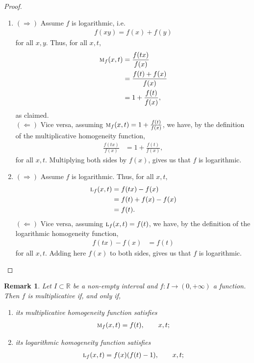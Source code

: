 \documentclass{amsart}
\theoremstyle{plain}
\newtheorem{remark}{Remark}
\numberwithin{equation}{section}
\newcommand{\R}{{\mathbb{R}}}
\begin{document}
\begin{proof}
    \begin{enumerate}
    \item
  \textbf{$(\Rightarrow)$} 
    Assume $f$ is logarithmic, i.e.
\begin{align*}
f(x y)= f(x) + f(y)  
\end{align*}
for all $x,y$.
 Thus, for all $x,t$,
\begin{align*}
\textsc{m}_f (x,t) &= \frac{f(tx)}{f(x)}\\
&=
\frac{f(t) + f(x)}{f(x)}\\
&=
1 + \frac{f(t)}{f(x)},
\end{align*}
as claimed. \\
\textbf{$(\Leftarrow)$} Vice versa, assuming $\textsc{m}_f (x,t)= 1 + \frac{f(t)}{f(x)}$,
we have, by the definition of the multiplicative homogeneity function,
\begin{align*}
\frac{f(tx)}{f(x)}
&=
1 + \frac{f(t)}{f(x)},
\end{align*}
for all $x,t$. 
Multiplying both sides by $f(x)$,
gives us that $f$ is logarithmic.
\item
 \textbf{$(\Rightarrow)$} 
    Assume $f$ is logarithmic.
Thus, for all $x,t$,
\begin{align*}
\textsc{l}_f (x,t) &= {f(tx)}-{f(x)}\\
&=
{f(t)+f(x)}-{f(x)} \\
&=
f(t).
\end{align*}
\textbf{$(\Leftarrow)$}    Vice versa, assuming $\textsc{l}_f (x,t)=f(t)$,
     we have, by the definition of the logarithmic homogeneity function,
\begin{align*}
 {f(tx)}-{f(x)}
&=
f(t)
\end{align*}
for all $x,t$.
Adding here $f(x)$ to both sides, gives us that $f$ is logarithmic.
\end{enumerate}
\end{proof}

\begin{remark}
Let $I \subset \R$ be a non-empty interval and
$f: I \to (0, + \infty)$ a function.
Then $f$ is multiplicative if, and only if,
\begin{enumerate}
    \item 
its multiplicative homogeneity function satisfies
\begin{align*}
\textsc{m}_f (x,t) =f(t), \qquad x,t;   
\end{align*}

\item 
its logarithmic homogeneity function satisfies
\begin{align*}
\textsc{l}_f (x,t) = f(x)(f(t)-1), \qquad x,t;   
\end{align*}
\end{enumerate}
\end{remark}
\end{document}
